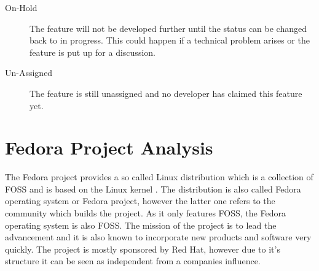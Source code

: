\begin{description}
\begin{description}
\begin{description}
        \item[On-Hold] The feature will not be developed further until the
          status can be changed back to in progress. This could happen if a
          technical problem arises or the feature is put up for a discussion.

        \item[Un-Assigned] The feature is still unassigned and no developer has
          claimed this feature yet.

      \end{description}


  \end{description}

\end{description}


\section{Fedora Project Analysis} %


The Fedora project provides a so called Linux distribution which is a
collection of \ac{FOSS} and is based on the Linux kernel
\cite{FedoraAbout,FedoraTogami}. The distribution is also called Fedora
operating system or Fedora project, however the latter one refers to the
community which builds the project. As it only features \ac{FOSS}, the Fedora
operating system is also \ac{FOSS}. The mission of the project is to lead the
advancement and it is also known to incorporate new products and software very
quickly. The project is mostly sponsored by Red Hat, however due to it's
structure it can be seen as independent from a companies influence.

